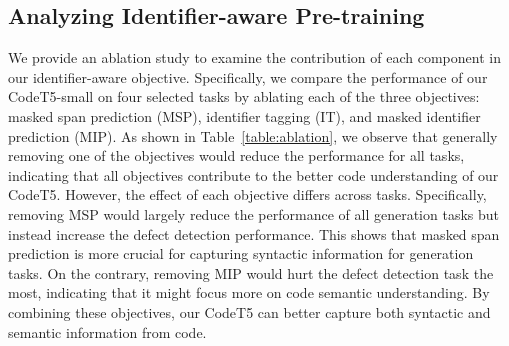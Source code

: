 \documentclass[11pt]{article}
\begin{document}
\subsection{Analyzing Identifier-aware  Pre-training}\label{sec:identifier}
We provide an ablation study to examine the contribution of each component in our identifier-aware objective.
Specifically, we compare the performance of our CodeT5-small on four selected tasks  by ablating each of the three objectives: masked span prediction (MSP), identifier tagging (IT), and masked identifier prediction (MIP).
As shown in Table~\ref{table:ablation}, we observe that generally removing one of the objectives would reduce the performance for all tasks, indicating that all objectives contribute to the better code understanding of our CodeT5.
However, the effect of each objective differs across tasks. Specifically,
removing   MSP  would largely reduce the performance of all generation tasks but instead increase the  defect detection performance.
This shows that masked span prediction is more crucial for capturing syntactic information for generation tasks.
On the contrary, removing MIP  would hurt the defect detection task the most, indicating that it might focus more on code semantic understanding.
By combining these objectives, our CodeT5 can better capture both syntactic and semantic information from code.
\end{document}
